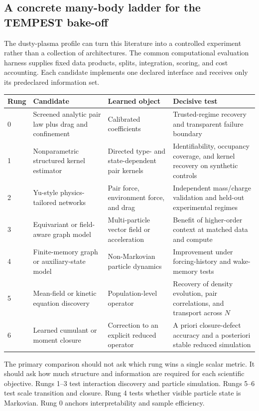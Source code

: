 \subsection{A concrete many-body ladder for the TEMPEST bake-off}

The dusty-plasma profile can turn this literature into a controlled experiment rather than a collection of architectures. The common computational evaluation harness supplies fixed data products, splits, integration, scoring, and cost accounting. Each candidate implements one declared interface and receives only its predeclared information set.

\begin{center}
\begin{tabularx}{\textwidth}{@{}P{0.12\textwidth}P{0.22\textwidth}P{0.22\textwidth}Y@{}}
\toprule
\textbf{Rung} & \textbf{Candidate} & \textbf{Learned object} & \textbf{Decisive test} \\
 & Screened analytic pair law plus drag and confinement & Calibrated coefficients & Trusted-regime recovery and transparent failure boundary \\
1 & Nonparametric structured kernel estimator & Directed type- and state-dependent pair kernels & Identifiability, occupancy coverage, and kernel recovery on synthetic controls \\
2 & Yu-style physics-tailored networks & Pair force, environment force, and drag & Independent mass/charge validation and held-out experimental regimes \\
3 & Equivariant or field-aware graph model & Multi-particle vector field or acceleration & Benefit of higher-order context at matched data and compute \\
4 & Finite-memory graph or auxiliary-state model & Non-Markovian particle dynamics & Improvement under forcing-history and wake-memory tests \\
5 & Mean-field or kinetic equation discovery & Population-level operator & Recovery of density evolution, pair correlations, and transport across \(N\) \\
6 & Learned cumulant or moment closure & Correction to an explicit reduced operator & A priori closure-defect accuracy and a posteriori stable reduced simulation \\
\bottomrule
\end{tabularx}
\end{center}

The primary comparison should not ask which rung wins a single scalar metric. It should ask how much structure and information are required for each scientific objective. Rungs 1--3 test interaction discovery and particle simulation. Rungs 5--6 test scale transition and closure. Rung 4 tests whether visible particle state is Markovian. Rung 0 anchors interpretability and sample efficiency.

